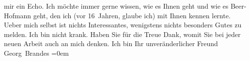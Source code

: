 \begin{ledgroupsized}[t]{13cm}
                    mir ein Echo.\pend
           \pstart
           Ich möchte immer gerne wissen, wie es {\pb}Ihnen geht und wie es Beer-Hofmann geht, den ich (vor 16 Jahren,
                    glaube ich) mit Ihnen kennen lernte.\pend
           \pstart
           Ueber mich selbst ist nichts Interessantes, wenigstens nichts besonders Gutes zu
                    melden. Ich bin nicht krank.\pend
           \pstart
           Haben Sie für die Treue Dank, womit Sie bei jeder neuen Arbeit auch an mich
                    denken.\pend
           \pstart
           Ich bin Ihr unveränderlicher Freund{\\[\baselineskip]}\spacefill\mbox{Georg Brandes}\pend
           \leftskip=0em{}          \endnumbering{}\end{ledgroupsized}  \newcommand{\dateiname}{L01991}\newcommand{\titel}{Georg Brandes an Arthur Schnitzler, 18. 12. 1910}\newcommand{\editorInnen}{Martin Anton Müller und Gerd-Hermann Susen}
            \footnotesize
\begin{ledgroupsized}[t]{11.5cm}
\end{ledgroupsized}
         
      